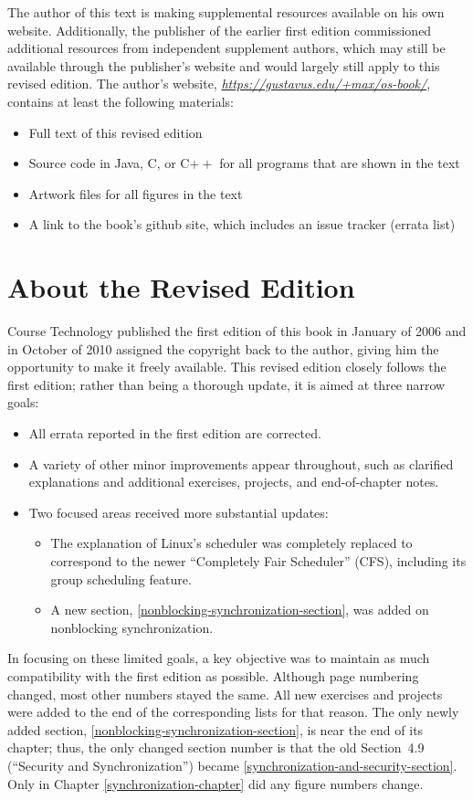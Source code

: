 The author of this text is making supplemental resources available on
his own website.  Additionally, the publisher of the
earlier first edition commissioned
additional resources from independent supplement authors,
which may still be available through the publisher's website
and would largely still apply to this revised edition.
The author's website, \textit{\url{https://gustavus.edu/+max/os-book/}},
contains at least the following materials:
\begin{itemize}
\item
Full text of this revised edition
\item
Source code in Java, C, or C$++$ for all programs
that are shown in the text
\item
Artwork files for all figures in the text
\item
A link to the book's github site, which includes an issue tracker (errata list)
\end{itemize}

\section*{About the Revised Edition}
Course Technology published the first edition of this book in January of 2006
and in October of 2010 assigned the copyright back to the author, giving him
the opportunity to make it freely available.  This revised edition closely follows
the first edition; rather than being a thorough update, it is aimed at three narrow goals:
\begin{itemize}
\item All errata reported in the first edition are corrected.
\item A variety of other minor improvements appear throughout, such as clarified explanations and additional exercises, projects, and end-of-chapter notes.
\item Two focused areas received more substantial updates:
\begin{itemize}
\item The explanation of Linux's scheduler was completely replaced to correspond to the newer ``Completely Fair Scheduler'' (CFS), including its group scheduling feature.
\item A new section, \ref{nonblocking-synchronization-section}, was added on nonblocking synchronization.
\end{itemize}
\end{itemize}

In focusing on these limited goals, a key objective was to maintain as much compatibility with the first edition as possible.  Although page numbering changed, most other numbers stayed the same.  All new exercises and projects were added to the end of the corresponding lists for that reason.  The only newly added section, \ref{nonblocking-synchronization-section}, is near the end of its chapter; thus, the only changed section number is that the old Section~4.9 (``Security and Synchronization'') became \ref{synchronization-and-security-section}.  Only in Chapter \ref{synchronization-chapter} did any figure numbers change.

